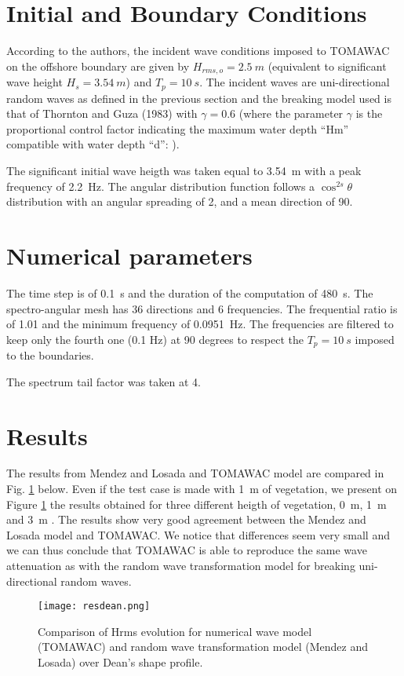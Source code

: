 \section{Initial and Boundary Conditions}
%
According to the authors, the incident wave conditions imposed to TOMA\-WAC on the offshore boundary are given by $H_{rms,o} = 2.5~m$ (equivalent to significant wave height $H_s = 3.54~m$) and $T_p = 10~s$.
The incident waves are uni-directional random waves as defined in the previous section and the breaking model used is that of Thornton and Guza (1983) with  $\gamma=0.6$ (where the parameter $\gamma$  is the proportional control factor indicating the maximum water depth “Hm” compatible with water depth “d”: ).

The significant initial wave heigth was taken equal to 3.54~m with a peak frequency of 2.2~Hz. The angular distribution function follows a $\cos^{2s} \theta$ distribution with an angular spreading of 2, and a mean direction of 90.

\section{Numerical parameters}
%
The time step is of 0.1~s and the duration of the computation of 480~s. The spectro-angular mesh has 36 directions and 6 frequencies. The frequential ratio is of 1.01 and the minimum frequency of 0.0951~Hz. The frequencies are filtered to keep only the fourth one (0.1 Hz) at 90 degrees to respect the $T_p= 10~s$ imposed to the boundaries.

The spectrum tail factor was taken at 4.

\section{Results}
%
 The results from Mendez and Losada and TOMAWAC model are compared in Fig. \ref{figresvito} below.
Even if the test case is made with 1~m of vegetation, we present on Figure \ref{figresvito} the results obtained for three different heigth of vegetation, 0~m, 1~m and 3~m \cite{Bacchi2014}.
The results show very good agreement between the Mendez  and Losada model \cite{Mendez2004} and TOMAWAC. We notice that differences seem very small and we can thus conclude that TOMAWAC is able to reproduce the same wave attenuation as with the random wave transformation model for breaking uni-directional random waves.
\begin{figure} [!h]
\centering
\texttt{[image: resdean.png]}
 \caption{Comparison of Hrms evolution for numerical wave model (TOMAWAC) and random wave transformation model (Mendez and Losada) over Dean’s shape profile.}
\label{figresvito}
\end{figure}


